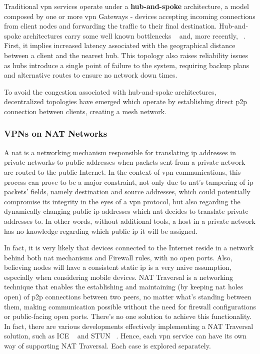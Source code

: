 \documentclass[11pt,twoside,a4paper]{report}
\begin{document}
Traditional \ac{vpn} services operate under a \textbf{hub-and-spoke} architecture, a model composed by one or more \ac{vpn} Gateways - devices accepting incoming connections from client nodes and forwarding the traffic to their final destination. Hub-and-spoke architectures carry some well known bottlenecks ~\cite{ELHEDHLI20051615, o1998geographer} and, more recently, ~\cite{AN2015103}. First, it implies increased latency associated with the geographical distance between a client and the nearest hub. This topology also raises reliability issues as hubs introduce a single point of failure to the system, requiring backup plans and alternative routes to ensure no network down times.

To avoid the congestion associated with hub-and-spoke architectures, decentralized topologies have emerged which operate by establishing direct \ac{p2p} connection between clients, creating a mesh network.
\fi

\subsubsection{VPNs on NAT Networks}

A \ac{nat} is a networking mechanism responsible for translating \ac{ip} addresses in private networks to public addresses when packets sent from a private network are routed to the public Internet. In the context of \ac{vpn} communications, this process can prove to be a major constraint, not only due to \ac{nat}'s tampering of \ac{ip} packets' fields, namely destination and source addresses, which could potentially compromise its integrity in the eyes of a \ac{vpn} protocol, but also regarding the dynamically changing public \ac{ip} addresses which \ac{nat} decides to translate private addresses to. In other words, without additional tools, a host in a private network has no knowledge regarding which public \ac{ip} it will be assigned.

In fact, it is very likely that devices connected to the Internet reside in a network behind both \ac{nat} mechanisms and Firewall rules, with no open ports. Also, believing nodes will have a consistent static \ac{ip} is a very naive assumption, especially when considering mobile devices. NAT Traversal is a networking technique that enables the establishing and maintaining (by keeping \ac{nat} holes open) of \ac{p2p} connections between two peers, no matter what's standing between them, making communication possible without the need for firewall configurations or public-facing open ports. There's no one solution to achieve this functionality. In fact, there are various developments effectively implementing a NAT Traversal solution, such as ICE ~\cite{rfc8445} and STUN ~\cite{rfc8489}. Hence, each \ac{vpn} service can have its own way of supporting NAT Traversal. Each case is explored separately.
\end{document}
